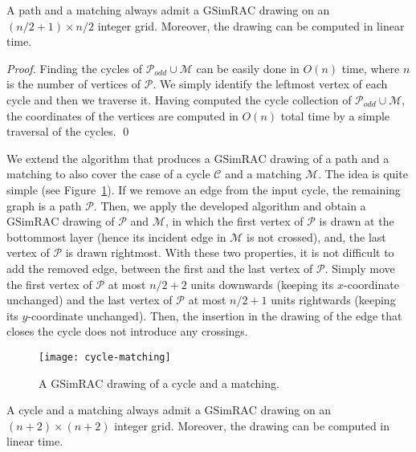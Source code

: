 \documentclass{llncs}
\newcommand{\GSimRAC}{\mathrm{GSimRAC}}
\begin{document}
\begin{theorem}
\label{thm:path-matching} A path and a matching always admit a
$\GSimRAC$ drawing on an $(n/2+1) \times n/2$ integer grid.
Moreover, the drawing can be computed in linear time.
\end{theorem}
\begin{proof}
Finding the cycles of $\mathcal{P}_{odd} \cup \mathcal{M}$ can be
easily done in $O(n)$ time, where $n$ is the number of vertices of
$\mathcal{P}$. We simply identify the leftmost vertex of each cycle
and then we traverse it. Having computed the cycle collection of
$\mathcal{P}_{odd} \cup \mathcal{M}$, the coordinates of the
vertices are computed in $O(n)$ total time by a simple traversal of
the cycles. \qed
\end{proof}


We extend the algorithm that produces a $\GSimRAC$ drawing of a path
and a matching to also cover the case of a cycle $\mathcal{C}$ and a
matching $\mathcal{M}$. The idea is quite simple (see
Figure~\ref{fig:cycle-matching}). If we remove an edge from the
input cycle, the remaining graph is a path $\mathcal{P}$. Then, we
apply the developed algorithm and obtain a $\GSimRAC$ drawing of
$\mathcal{P}$ and $\mathcal{M}$, in which the first vertex of
$\mathcal{P}$ is drawn at the bottommost layer (hence its incident
edge in $\mathcal{M}$ is not crossed), and, the last vertex of
$\mathcal{P}$ is drawn rightmost. With these two properties, it is
not difficult to add the removed edge, between the first and the
last vertex of $\mathcal{P}$. Simply move the first vertex of
$\mathcal{P}$ at most $n/2+2$ units downwards (keeping its
$x$-coordinate unchanged) and the last vertex of $\mathcal{P}$ at
most $n/2+1$ units rightwards (keeping its $y$-coordinate
unchanged). Then, the insertion in the drawing of the edge that
closes the cycle does not introduce any crossings.

\begin{figure}[h!tb]
  \centering
  \texttt{[image: cycle-matching]}
  \caption{A $\GSimRAC$ drawing of a cycle and a matching.}
  \label{fig:cycle-matching}
\end{figure}

\begin{theorem}
\label{thm:cycle-matching} A cycle and a matching always admit a
$\GSimRAC$ drawing on an $(n+2)\times(n+2)$ integer grid. Moreover,
the drawing can be computed in linear time.
\end{theorem}
\end{document}
